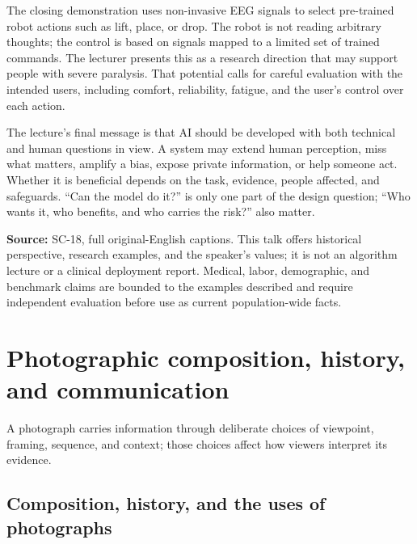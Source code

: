 \hypertarget{04-visual-computing-ii-ch034-human-augmentation-includes-accessibility}{}

The closing demonstration uses non-invasive EEG signals to select pre-trained robot actions such as lift, place, or drop. The robot is not reading arbitrary thoughts; the control is based on signals mapped to a limited set of trained commands. The lecturer presents this as a research direction that may support people with severe paralysis. That potential calls for careful evaluation with the intended users, including comfort, reliability, fatigue, and the user's control over each action.

The lecture's final message is that AI should be developed with both technical and human questions in view. A system may extend human perception, miss what matters, amplify a bias, expose private information, or help someone act. Whether it is beneficial depends on the task, evidence, people affected, and safeguards. ``Can the model do it?'' is only one part of the design question; ``Who wants it, who benefits, and who carries the risk?'' also matter.

\textbf{Source:} SC-18, full original-English captions. This talk offers historical perspective, research examples, and the speaker's values; it is not an algorithm lecture or a clinical deployment report. Medical, labor, demographic, and benchmark claims are bounded to the examples described and require independent evaluation before use as current population-wide facts.

\section{Photographic composition, history, and communication}\label{04-visual-computing-ii-ch034-photographic-composition-history-and-communication}

\hypertarget{04-visual-computing-ii-ch034-photographic-composition-history-and-communication}{}

A photograph carries information through deliberate choices of viewpoint, framing, sequence, and context; those choices affect how viewers interpret its evidence.

\subsection{Composition, history, and the uses of photographs}\label{04-visual-computing-ii-ch034-composition-history-and-the-uses-of-photographs}

